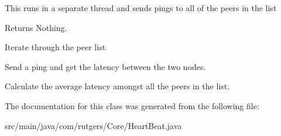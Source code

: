 This runs in a separate thread and sends pings to all of the peers in the list \begin{DoxyReturn}{Returns}
Nothing. 
\end{DoxyReturn}
Iterate through the peer list

Send a ping and get the latency between the two nodes.

Calculate the average latency amongst all the peers in the list.

The documentation for this class was generated from the following file\+:\begin{DoxyCompactItemize}
\item 
src/main/java/com/rutgers/\+Core/Heart\+Beat.\+java\end{DoxyCompactItemize}
